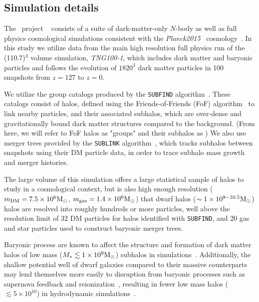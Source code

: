\documentclass[twocolumn]{aastex631}
\begin{document}
    \subsection{Simulation details} \label{sec:methods-sims}
    The \tng\ project ~\citep{TNG1, TNG2, TNG3, TNG4, TNG5} consists of a suite of dark-matter-only $N$-body as well as full physics cosmological simulations consistent with the \textit{Planck2015} \lcdm\  cosmology~\citep{Planck2015}.
    In this study we utilize data from the main high resolution full physics run of the (110.7\Mpc)$^3$ volume simulation, \textsl{TNG100-1}, which includes dark matter and baryonic particles and follows the evolution of $1820^3$ dark matter particles in 100 snapshots from $z=127$ to $z=0$. 

    We utilize the group catalogs produced by the \texttt{SUBFIND} algorithm~\citep{springel2001,dolag09}. 
    These catalogs consist of halos, defined using the Friends-of-Friends (FoF) algorithm~\citep{davis1985} to link nearby particles, and their associated subhalos, which are over-dense and gravitationally bound dark matter structures compared to the background. (From here, we will refer to FoF halos as "groups" and their subhalos as )
    We also use merger trees provided by the \texttt{SUBLINK} algorithm~\citep{RG2015}, which tracks subhalos between snapshots using their DM particle data, in order to trace subhalo mass growth and merger histories.
    
    The large volume of this simulation offers a large statistical sample of halos to study in a cosmological context, but is also high enough resolution ($m_{\rm DM} = 7.5\times10^6\mathrm{M}_\odot$, $m_{\rm gas} = 1.4\times10^6\mathrm{M}_\odot$) that dwarf halos ($\sim1\times10^{9-10.5}\mathrm{M}_\odot$) halos are resolved into roughly hundreds or more particles, well above the resolution limit of 32 DM particles for halos identified with \texttt{SUBFIND}, and 20 gas and star particles used to construct baryonic merger trees.  

    Baryonic process are known to affect the structure and formation of dark matter halos of low mass ($M_*\lesssim 1\times10^9\mathrm{M}_\odot$) subhalos in simulations~\citep[see e.g.][and references therein]{Sales:2022}.
    Additionally, the shallow potential well of dwarf galaxies compared to their massive counterparts may lend themselves more easily to disruption from baryonic processes such as supernova feedback and reionization~\citep{}, resulting in fewer low mass halos ($\lesssim 5\times10^{10}$) in hydrodynamic simulations~\citep{vogelsberger14B}.
\end{document}
